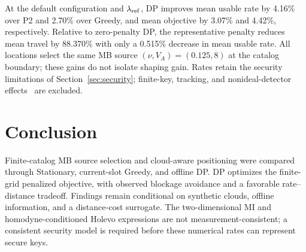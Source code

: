 At the default configuration and $\lambda_{\rm ref}$, DP improves mean
usable rate by 4.16\% over P2 and 2.70\% over Greedy, and mean objective
by 3.07\% and 4.42\%, respectively. Relative to zero-penalty DP, the
representative penalty reduces mean travel by 88.370\% with only a 0.515\%
decrease in mean usable rate. All locations select the same
MB source $(\nu,V_A)=(0.125,8)$ at the catalog boundary; these gains
do not isolate shaping gain. Rates retain the security limitations of
Section~\ref{sec:security}; finite-key, tracking, and nonideal-detector
effects~\cite{usenko2016} are excluded.

\section{Conclusion}
\label{sec:conclusion}
Finite-catalog MB source selection and cloud-aware positioning were
compared through Stationary, current-slot Greedy, and offline DP.
DP optimizes the finite-grid penalized objective, with observed blockage
avoidance and a favorable rate--distance tradeoff. Findings remain
conditional on synthetic clouds, offline information, and a distance-cost
surrogate. The two-dimensional MI and homodyne-conditioned Holevo
expressions are not measurement-consistent; a consistent security model
is required before these numerical rates can represent secure keys.

